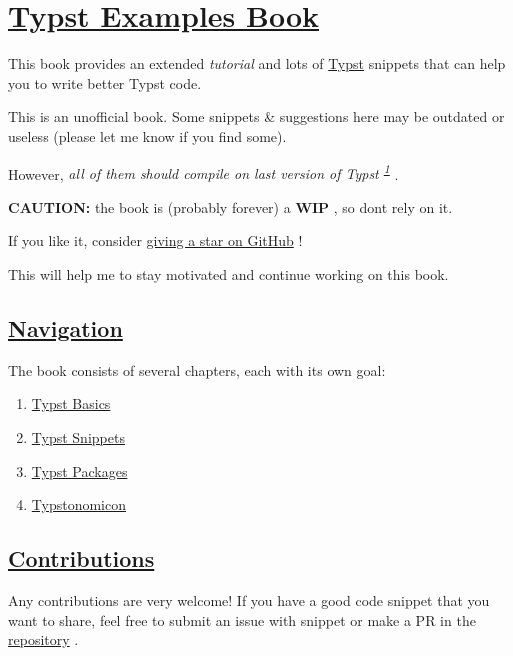 \section{\texorpdfstring{\hyperref[typst-examples-book]{Typst Examples
Book}}{Typst Examples Book}}\label{typst-examples-book}

This book provides an extended \emph{tutorial} and lots of
\href{https://github.com/typst/typst}{Typst} snippets that can help you
to write better Typst code.

This is an unofficial book. Some snippets \& suggestions here may be
outdated or useless (please let me know if you find some).

However, \emph{all of them should compile on last version of Typst
\textsuperscript{\hyperref[1]{1}}} .

\textbf{CAUTION:} the book is (probably forever) a \textbf{WIP} , so
don\textquotesingle t rely on it.

If you like it, consider
\href{https://github.com/sitandr/typst-examples-book}{giving a star on
GitHub} !

This will help me to stay motivated and continue working on this book.

\subsection{\texorpdfstring{\hyperref[navigation]{Navigation}}{Navigation}}\label{navigation}

The book consists of several chapters, each with its own goal:

\begin{enumerate}
\tightlist
\item
  \href{./basics/index.html}{Typst Basics}
\item
  \href{./snippets/index.html}{Typst Snippets}
\item
  \href{./packages/index.html}{Typst Packages}
\item
  \href{./typstonomicon/index.html}{Typstonomicon}
\end{enumerate}

\subsection{\texorpdfstring{\hyperref[contributions]{Contributions}}{Contributions}}\label{contributions}

Any contributions are very welcome! If you have a good code snippet that
you want to share, feel free to submit an issue with snippet or make a
PR in the
\href{https://github.com/sitandr/typst-examples-book}{repository} .

